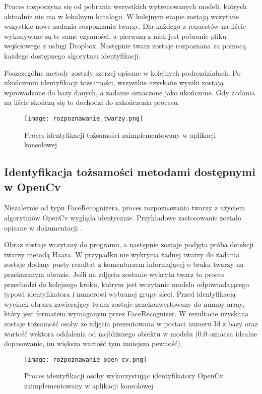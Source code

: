 Proces rozpoczyna się od pobrania wszystkich wytrenowanych modeli, których aktualnie nie ma w lokalnym katalogu. W kolejnym etapie zostają wczytane wszystkie nowe zadania rozpoznania twarzy. Dla każdego z requestów na liście wykonywane są te same czynności, a pierwszą z nich jest pobranie pliku wejściowego z usługi Dropbox. Następnie twarz zostaje rozpoznana za pomocą każdego dostępnego algorytmu identyfikacji. 

Poszczególne metody zostały szerzej opisane w kolejnych podrozdziałach. Po ukończeniu identyfikacji tożsamości, wszystkie uzyskane wyniki zostają wprowadzone do bazy danych, a zadanie oznaczone jako ukończone. Gdy zadania na liście skończą się to dochodzi do zakończenia procesu.
\begin{figure}[H]
	\centering
	\texttt{[image: rozpoznawanie\_twarzy.png]}
	\caption{Proces identyfikacji tożsamości zaimplementowany w aplikacji konsolowej}
	\label{fig:rozpoznawanie_proces}
\end{figure}

\subsection{Identyfikacja tożsamości metodami dostępnymi w OpenCv}
Niezależnie od typu FaceRecognizera, proces rozpoznawania twarzy z użyciem algorytmów OpenCv wygląda identycznie. Przykładowe zastosowanie zostało opisane w dokumentacji \cite{opencv_doc}. 

Obraz zostaje wczytany do programu, a następnie zostaje podjęta próba detekcji twarzy metodą Haara. W przypadku nie wykrycia żadnej twarzy do zadania zostaje dodany pusty rezultat z komentarzem informującej o braku twarzy na przekazanym obrazie. 
Jeśli na zdjęciu zostanie wykryta twarz to proces przechodzi do kolejnego kroku, którym jest wczytanie modelu odpowiadającego typowi identyfikatora i numerowi wybranej grupy sieci. Przed identyfikacją wycinek obrazu zawierający twarz zostaje przekonwertowany do numpy array, który jest formatem wymaganym przez FaceRecognizer. W rezultacie uzyskana zostaje tożsamość osoby ze zdjęcia prezentowana w postaci numeru Id z bazy oraz wartość wektora oddalenia od najbliższego obiektu w modelu (0.0 oznacza idealne dopasowanie, im większa wartość tym mniejsza pewność). 
\begin{figure}[H]
	\centering
	\texttt{[image: rozpoznawanie\_open\_cv.png]}
	\caption{Proces identyfikacji osoby wykorzystując identyfikatory OpenCv zaimplementowany w aplikacji konsolowej}
	\label{fig:rozpoznawanie_open_cv}
\end{figure}

